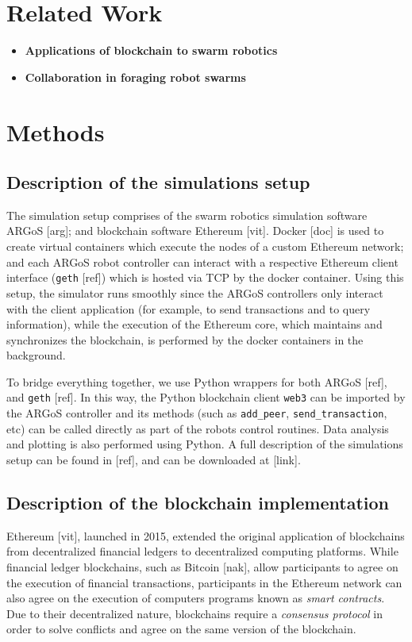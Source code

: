 \documentclass[runningheads]{llncs}
\newcommand{\blue}[1]{\textcolor{blue}{#1}}
\begin{document}
\section{Related Work}
\label{sec:related-work}

\begin{itemize}
\item \textbf{Applications of blockchain to swarm robotics}
\item \textbf{Collaboration in foraging robot swarms}
\end{itemize}

\blue{\lipsum[1-5]}

\section{Methods}
\label{sec:methods}

\subsection{Description of the simulations setup}

The simulation setup comprises of the swarm robotics simulation software ARGoS [arg]; and blockchain software Ethereum [vit]. Docker [doc] is used to create virtual containers which execute the nodes of a custom Ethereum network; and each ARGoS robot controller can interact with a respective Ethereum client interface (\texttt{geth} [ref]) which is hosted via TCP by the docker container.
Using this setup, the simulator runs smoothly since the ARGoS controllers only interact with the client application (for example, to send transactions and to query information), while the execution of the Ethereum core, which maintains and synchronizes the blockchain, is performed by the docker containers in the background.
 
 To bridge everything together, we use Python wrappers for both ARGoS [ref], and \texttt{geth} [ref]. In this way, the Python blockchain client \texttt{web3} can be imported by the ARGoS controller and its methods (such as \texttt{add\_peer}, \texttt{send\_transaction}, etc) can be called directly as part of the robots control routines. Data analysis and plotting is also performed using Python.
  A full description of the simulations setup can be found in [ref], and can be downloaded at [link].

\subsection{Description of the blockchain implementation}
 Ethereum [vit], launched in 2015, extended the original application of blockchains from decentralized financial ledgers to decentralized computing platforms. While financial ledger blockchains, such as Bitcoin [nak], allow participants to agree on the execution of financial transactions, participants in the Ethereum network can also agree on the execution of computers programs known as \emph{smart contracts}. Due to their decentralized nature, blockchains require a \emph{consensus protocol} in order to solve conflicts and agree on the same version of the blockchain.
\end{document}
